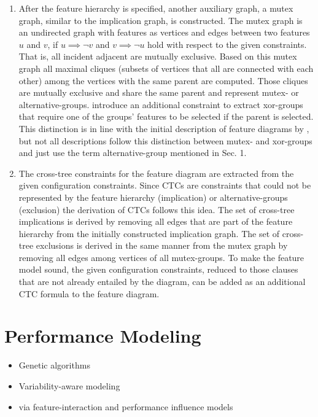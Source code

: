 \begin{enumerate}
  \item After the feature hierarchy is specified, another auxiliary graph, a
  mutex graph, similar to the implication graph, is constructed. The mutex
  graph is an undirected graph with features as vertices and edges between two
  features $u$ and $v$, if $u \implies \neg{v}$ and $v \implies \neg{u}$ hold
  with respect to the given constraints. That is, all incident adjacent are mutually exclusive. Based on
  this mutex graph all maximal cliques (subsets of vertices that all are
  connected with each other) among the vertices with the same parent are
  computed. Those cliques are mutually exclusive and share the same parent and
  represent mutex- or alternative-groups. \cite{she_reverse_2011} introduce an
  additional constraint to extract xor-groups that require one of the groups’
  features to be selected if the parent is selected. This distinction is in
  line with the initial description of feature diagrams by \cite{kang_feature-oriented_1990},
  but not all descriptions follow this distinction between mutex- and
  xor-groups and just use the term alternative-group mentioned in Sec. 1.
  
  \item The cross-tree constraints for the feature diagram are extracted from
  the given configuration constraints. Since CTCs are constraints that could
  not be represented by the feature hierarchy (implication) or
  alternative-groups (exclusion) the derivation of CTCs follows this idea. The
  set of cross-tree implications is derived by removing all edges that are part
  of the feature hierarchy from the initially constructed implication graph.
  The set of cross-tree exclusions is derived in the same manner from the mutex
  graph by removing all edges among vertices of all mutex-groups. To make the
  feature model sound, the given configuration constraints, reduced to those
  clauses that are not already entailed by the diagram, can be added as an
  additional CTC formula to the feature diagram.
\end{enumerate}


\section{Performance Modeling} \label{sec:2.4}
\begin{itemize}
  \item Genetic algorithms \citep{guo_genetic_2011}
  \item Variability-aware modeling \citep{guo_variability-aware_2013}
  \item via feature-interaction and performance influence models
  \citep{siegmund_predicting_2012,siegmund_performance-influence_2015}
\end{itemize}